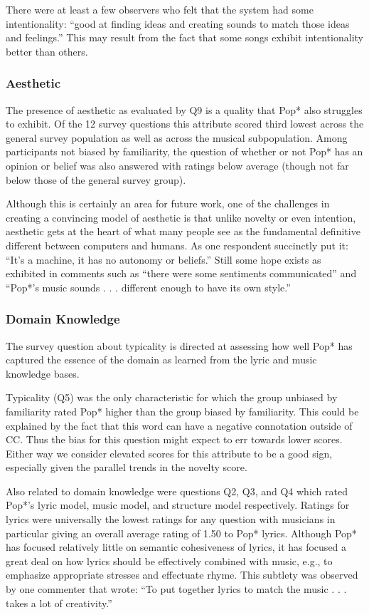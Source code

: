 \documentclass[phd,electronic,oneside,twosidetoc,letterpaper,chaptercenter,parttop,lol,lof,lot]{byumsphd}
\begin{document}
There were at least a few observers who felt that the system had some intentionality: ``good at finding ideas and creating sounds to match those ideas and feelings.'' This may result from the fact that some songs exhibit intentionality better than others.

\subsubsection{Aesthetic}

The presence of aesthetic as evaluated by Q9 is a quality that Pop* also struggles to exhibit. Of the 12 survey questions this attribute scored third lowest across the general survey population as well as across the musical subpopulation. Among participants not biased by familiarity, the question of whether or not Pop* has an opinion or belief was also answered with ratings below average (though not far below those of the general survey group).

Although this is certainly an area for future work, one of the challenges in creating a convincing model of aesthetic is that unlike novelty or even intention, aesthetic gets at the heart of what many people see as the fundamental definitive different between computers and humans. As one respondent succinctly put it: ``It's a machine, it has no autonomy or beliefs.'' Still some hope exists as exhibited in comments such as ``there were some sentiments communicated'' and ``Pop*'s music sounds . . . different enough to have its own style.''

\subsubsection{Domain Knowledge}

The survey question about typicality is directed at assessing how well Pop* has captured the essence of the domain as learned from the lyric and music knowledge bases.

Typicality (Q5) was the only characteristic for which the group unbiased by familiarity rated Pop* higher than the group biased by familiarity. This could be explained by the fact that this word can have a negative connotation outside of CC. Thus the bias for this question might expect to err towards lower scores. Either way we consider elevated scores for this attribute to be a good sign, especially given the parallel trends in the novelty score.

Also related to domain knowledge were questions Q2, Q3, and Q4 which rated Pop*'s lyric model, music model, and structure model respectively. Ratings for lyrics were universally the lowest ratings for any question with musicians in particular giving an overall average rating of 1.50 to Pop* lyrics. Although Pop* has focused relatively little on semantic cohesiveness of lyrics, it has focused a great deal on how lyrics should be effectively combined with music, e.g., to emphasize appropriate stresses and effectuate rhyme. This subtlety was observed by one commenter that wrote: ``To put together lyrics to match the music . . . takes a lot of creativity.''
\end{document}
